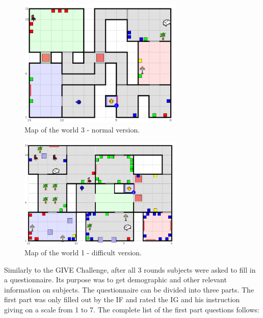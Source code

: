 \begin{figure}[!htbp]
  \centering
	\includegraphics[width=0.7\textwidth]{Images/dataset-world3}
	\caption{Map of the world 3 - normal version.}
	\label{fig:dataset-world3}
\end{figure}

\begin{figure}[!htbp]
  \centering
	\includegraphics[width=0.7\textwidth]{Images/dataset-world1d}
	\caption{Map of the world 1 - difficult version.}
	\label{fig:dataset-world1d}
\end{figure}

Similarly to the GIVE Challenge, after all 3 rounds subjects were asked to fill in a questionnaire. Its purpose was to get demographic and other relevant information on subjects. The questionnaire can be divided into three parts. The first part was only filled out by the IF and rated the IG and his instruction giving on a scale from 1 to 7. The complete list of the first part questions follows: 

